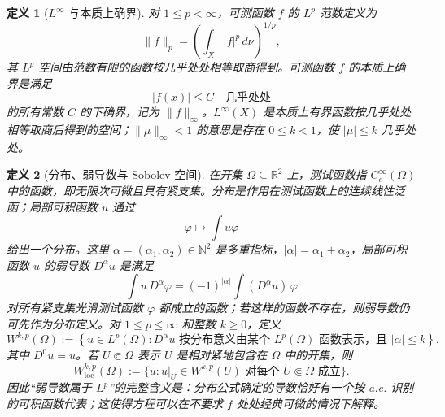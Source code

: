 \documentclass[UTF8,fontset=none,a4paper,11pt]{ctexart}
\theoremstyle{foundation-definition}
\newtheorem{definition}{定义}[section]
\theoremstyle{foundation-theorem}
\theoremstyle{foundation-proposition}
\theoremstyle{foundation-example}
\theoremstyle{foundation-remark}
\theoremstyle{foundation-theorem}
\begin{document}
\begin{definition}[\(L^\infty\) 与本质上确界]\label{def:linfty}
对 \(1\leq p<\infty\)，可测函数 \(f\) 的 \(L^p\) 范数定义为
\[
\|f\|_p=\left(\int_X|f|^p\,d\nu\right)^{1/p},
\]
其 \(L^p\) 空间由范数有限的函数按几乎处处相等取商得到。可测函数 \(f\) 的本质上确界是满足
\[
\lvert f(x)\rvert\leq C\quad\text{几乎处处}
\]
的所有常数 \(C\) 的下确界，记为 \(\|f\|_\infty\)。\(L^\infty(X)\) 是本质上有界函数按几乎处处相等取商后得到的空间；\(\|\mu\|_\infty<1\) 的意思是存在 \(0\leq k<1\)，使 \(|\mu|\leq k\) 几乎处处。
\end{definition}

\begin{definition}[分布、弱导数与 Sobolev 空间]\label{def:weak-derivative}
在开集 \(\Omega\subseteq\mathbb R^2\) 上，测试函数指 \(C_c^\infty(\Omega)\) 中的函数，即无限次可微且具有紧支集。分布是作用在测试函数上的连续线性泛函；局部可积函数 \(u\) 通过
\[
\varphi\longmapsto\int u\varphi
\]
给出一个分布。这里 \(\alpha=(\alpha_1,\alpha_2)\in\mathbb N^2\) 是多重指标，\(|\alpha|=\alpha_1+\alpha_2\)，局部可积函数 \(u\) 的弱导数 \(D^\alpha u\) 是满足
\[
\int u\,D^\alpha\varphi
=(-1)^{|\alpha|}\int (D^\alpha u)\,\varphi
\]
对所有紧支集光滑测试函数 \(\varphi\) 都成立的函数；若这样的函数不存在，则弱导数仍可先作为分布定义。对 \(1\leq p\leq\infty\) 和整数 \(k\geq0\)，定义
\[
W^{k,p}(\Omega):=\left\{u\in L^p(\Omega):
  D^\alpha u\text{ 按分布意义由某个 }L^p(\Omega)\text{ 函数表示，且 }|\alpha|\leq k\right\},
\]
其中 \(D^0u=u\)。若 \(U\Subset\Omega\) 表示 \(U\) 是相对紧地包含在 \(\Omega\) 中的开集，则
\[
W^{k,p}_{\mathrm{loc}}(\Omega):=
\{u:u|_U\in W^{k,p}(U)\text{ 对每个 }U\Subset\Omega\text{ 成立}\}.
\]
因此“弱导数属于 \(L^p\)”的完整含义是：分布公式确定的导数恰好有一个按 a.e. 识别的可积函数代表；这使得方程可以在不要求 \(f\) 处处经典可微的情况下解释。
\end{definition}
\end{document}

